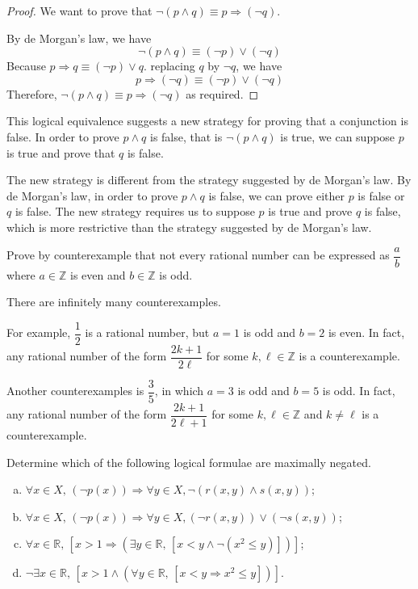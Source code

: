 \begin{solutions*}
    \fixlistskip
    \begin{proof}
        We want to prove that $\neg (p \wedge q) \equiv p \Rightarrow (\neg q)$.

        By de Morgan's law, we have 
        \[\neg (p \wedge q) \equiv (\neg p) \vee (\neg q)\]
        Because $p \Rightarrow q \equiv (\neg p) \vee q$. replacing $q$ by $\neg q$, we have
        \[p \Rightarrow (\neg q) \equiv (\neg p) \vee (\neg q)\]
        Therefore, $\neg (p \wedge q) \equiv p \Rightarrow (\neg q)$ as required.
    \end{proof}

    This logical equivalence suggests a new strategy for proving that a conjunction is false. In order to prove $p \wedge q$ is false, that is $\neg (p \wedge q)$ is true, we can suppose $p$ is true and prove that $q$ is false.

    The new strategy is different from the strategy suggested by de Morgan's law. By de Morgan's law, in order to prove $p \wedge q$ is false, we can prove either $p$ is false or $q$ is false. The new strategy requires us to suppose $p$ is true and prove $q$ is false, which is more restrictive than the strategy suggested by de Morgan's law.
\end{solutions*}


\begin{exercise}
Prove by counterexample that not every rational number can be expressed as $\dfrac{a}{b}$ where $a \in \mathbb{Z}$ is even and $b \in \mathbb{Z}$ is odd.
\end{exercise}

\begin{solutions*}
    There are infinitely many counterexamples. 
    
    For example, $\dfrac{1}{2}$ is a rational number, but $a=1$ is odd and $b=2$ is even. In fact, any rational number of the form $\dfrac{2k+1}{2\ell}$ for some $k, \ell \in \mathbb{Z}$ is a counterexample.

    Another counterexamples is $\dfrac{3}{5}$, in which $a=3$ is odd and $b=5$ is odd. In fact, any rational number of the form $\dfrac{2k+1}{2\ell+1}$ for some $k, \ell \in \mathbb{Z}$ and $k \ne \ell$ is a counterexample.
\end{solutions*}


\begin{exercise}
Determine which of the following logical formulae are maximally negated.
\begin{enumerate}[(a)]
\item $\forall x \in X,\, (\neg p(x)) \Rightarrow \forall y \in X, \neg (r(x,y) \wedge s(x,y))$;
\item $\forall x \in X,\, (\neg p(x)) \Rightarrow \forall y \in X, (\neg r(x,y)) \vee (\neg s(x,y))$;
\item $\forall x \in \mathbb{R},\, [x > 1 \Rightarrow (\exists y \in \mathbb{R},\, [x < y \wedge \neg (x^2 \le y)])]$;
\item $\neg \exists x \in \mathbb{R},\, [x > 1 \wedge (\forall y \in \mathbb{R},\, [x < y \Rightarrow x^2 \le y])]$.
\end{enumerate}
\end{exercise}

